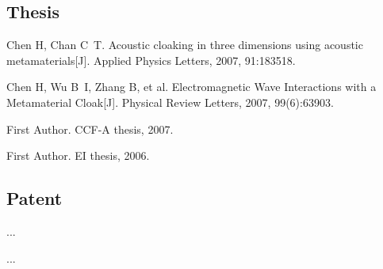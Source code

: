 \begin{achievements}

  \subsection*{Thesis}

  \begin{bibliolist}{00}
    \item Chen H, Chan C~T. Acoustic cloaking in three dimensions using acoustic metamaterials[J]. Applied Physics Letters, 2007, 91:183518.
    \item Chen H, Wu B~I, Zhang B, et al. Electromagnetic Wave Interactions with a Metamaterial Cloak[J]. Physical Review Letters, 2007, 99(6):63903.
  \end{bibliolist}

  \begin{bibliolist*}{00}
    \item First Author. CCF-A thesis, 2007.
    \item First Author. EI thesis, 2006.
  \end{bibliolist*}

  \subsection*{Patent}

  \begin{bibliolist}{00}
    \item ...
  \end{bibliolist}

  \begin{bibliolist*}{00}
    \item ...
  \end{bibliolist*}

\end{achievements}
